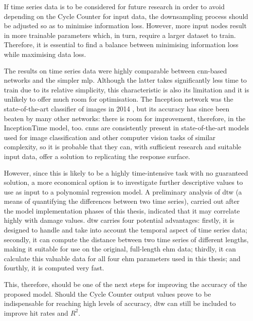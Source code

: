 If time series data is to be considered for future research in order to avoid depending on the Cycle Counter for input data, the downsampling process should be adjusted so as to minimise information loss. However, more input nodes result in more trainable parameters which, in turn, require a larger dataset to train. Therefore, it is essential to find a balance between minimising information loss while maximising data loss.

The results on time series data were highly comparable between \ac{cnn}-based networks and the simpler \ac{mlp}. Although the latter takes significantly less time to train due to its relative simplicity, this characteristic is also its limitation and it is unlikely to offer much room for optimisation. The Inception network was the state-of-the-art classifier of images in 2014 \cite[]{szegedy_going_2014}, but its accuracy has since been beaten by many other networks: there is room for improvement, therefore, in the InceptionTime model, too. \ac{cnn}s are consistently present in state-of-the-art models used for image classification and other computer vision tasks of similar complexity, so it is probable that they can, with sufficient research and suitable input data, offer a solution to replicating the response surface.

However, since this is likely to be a highly time-intensive task with no guaranteed solution, a more economical option is to investigate further descriptive values to use as input to a polynomial regression model. A preliminary analysis of \ac{dtw} (a means of quantifying the differences between two time series), carried out after the model implementation phases of this thesis, indicated that it may correlate highly with damage values. \ac{dtw} carries four potential advantages: firstly, it is designed to handle and take into account the temporal aspect of time series data; secondly, it can compute the distance between two time series of different lengths, making it suitable for use on the original, full-length \ac{ehm} data; thirdly, it can calculate this valuable data for all four \ac{ehm} parameters used in this thesis; and fourthly, it is computed very fast. %

This, therefore, should be one of the next steps for improving the accuracy of the proposed model. Should the Cycle Counter output values prove to be indispensable for reaching high levels of accuracy, \ac{dtw} can still be included to improve hit rates and \(R^2\).